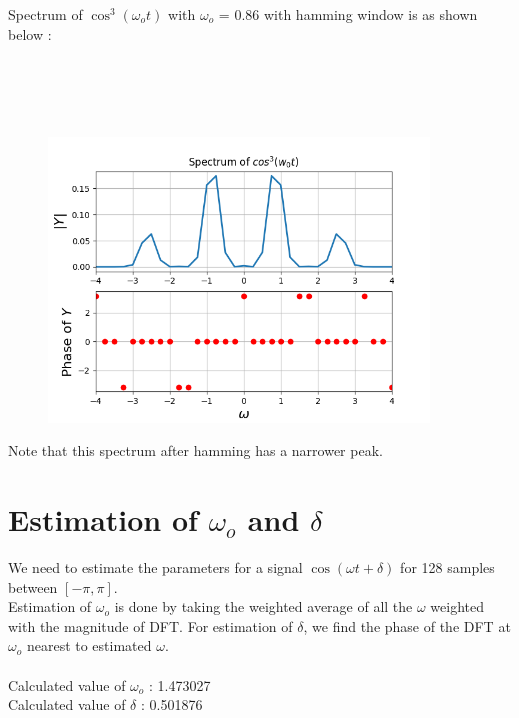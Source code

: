 \documentclass[10pt,a4paper]{article}
\begin{document}
Spectrum of $\cos^{3} (\omega_ot)$ with $\omega_o$ = 0.86 with hamming window is as shown below : \\\\\\\\\\

\begin{figure}[!tbh]

\includegraphics[width = 0.9\textwidth]{2-spectrum of cos cube(0.86t) with windowing}

\end{figure}
Note that this spectrum after hamming has a narrower peak.

\section{Estimation of $\omega_o$ and $\delta$}
We need to estimate the parameters for a signal $\cos(\omega t+\delta)$ for 128 samples between $[-\pi, \pi]$.\\
Estimation of $\omega_o$ is done by taking the weighted average of all the $\omega$ weighted with the magnitude of DFT. For estimation of $\delta$, we find the phase of the DFT at $\omega_o$ nearest to estimated $\omega$.\\\\
Calculated value of $\omega_o$ : 1.473027\\
Calculated value of $\delta$       : 0.501876\\
\end{document}
